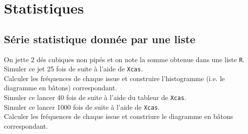 \documentclass[a4paper,11pt]{book}
\begin{document}
\chapter{Statistiques}

\section{S\'erie statistique donn\'ee par une liste}\index{\$}
On jette 2 d\'es cubiques non pip\'es et on note la somme obtenue dans une 
liste {\tt R}.\\
Simuler ce jet 25 fois de suite \`a l'aide de {\tt Xcas}.\\
Calculer les fr\'equences de chaque issue et construire l'histogramme (i.e. le 
diagramme en b\^atons) correspondant.\\
Simuler ce lancer 40 fois de suite \`a l'aide du tableur de {\tt Xcas}.\\
Simuler ce lancer 1000 fois de suite \`a l'aide de {\tt Xcas}.\\
Calculer les fr\'equences de chaque issue et constriure le diagramme en 
b\^atons correspondant.\\
\end{document}
